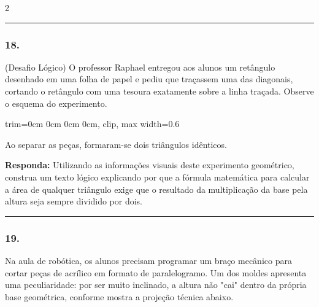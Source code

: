 \documentclass[twoside, 10pt, a4paper]{article}
\newlength{\espacoPreQuestao}\setlength{\espacoPreQuestao}{0.1cm}
\newlength{\espacoQuestao}\setlength{\espacoQuestao}{0.2cm}
\begin{document}
\begin{multicols*}{2}
\noindent\textcolor{CorLinha}{\rule{\linewidth}{0.5pt}} 
\par\vspace{\espacoPreQuestao}
\subsubsection*{18.} (Desafio Lógico) O professor Raphael entregou aos alunos um retângulo desenhado em uma folha de papel e pediu que traçassem uma das diagonais, cortando o retângulo com uma tesoura exatamente sobre a linha traçada. Observe o esquema do experimento.

\begin{center}
\begin{adjustbox}{trim=0cm 0cm 0cm 0cm, clip, max width=0.6\linewidth}
\end{adjustbox}
\end{center}

Ao separar as peças, formaram-se dois triângulos idênticos. 
\begin{boxresponda}
\textbf{Responda:} Utilizando as informações visuais deste experimento geométrico, construa um texto lógico explicando por que a fórmula matemática para calcular a área de qualquer triângulo exige que o resultado da multiplicação da base pela altura seja sempre dividido por dois.
\end{boxresponda}
\par\vspace{\espacoQuestao}

\noindent\textcolor{CorLinha}{\rule{\linewidth}{0.5pt}} 
\par\vspace{\espacoPreQuestao}
\subsubsection*{19.} Na aula de robótica, os alunos precisam programar um braço mecânico para cortar peças de acrílico em formato de paralelogramo. Um dos moldes apresenta uma peculiaridade: por ser muito inclinado, a altura não "cai" dentro da própria base geométrica, conforme mostra a projeção técnica abaixo.


\end{multicols*}
\end{document}
